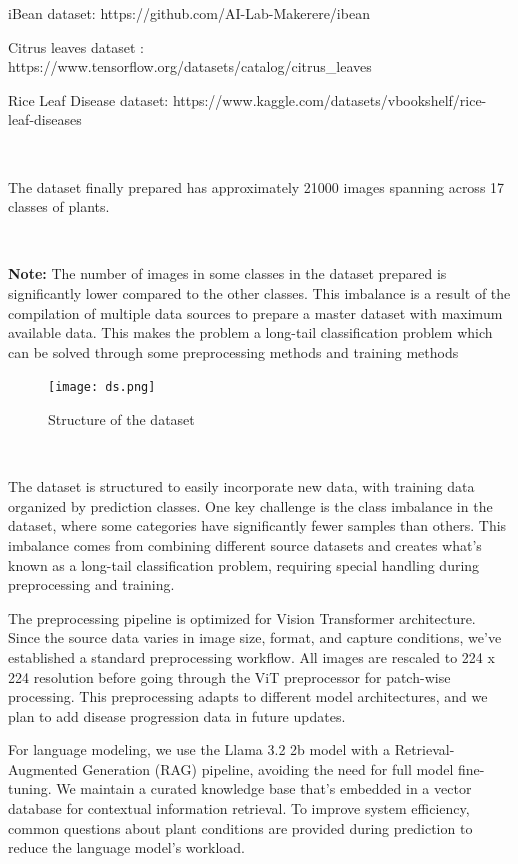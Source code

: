 iBean dataset: https://github.com/AI-Lab-Makerere/ibean

Citrus leaves dataset : https://www.tensorflow.org/datasets/catalog/citrus\_leaves

Rice Leaf Disease dataset: https://www.kaggle.com/datasets/vbookshelf/rice-leaf-diseases

\

The dataset finally prepared has approximately 21000 images spanning across 17 classes of plants.

\

 \textbf{Note:} The number of images in some classes in the dataset prepared is significantly lower compared to the other classes. This imbalance is a result of the compilation of multiple data sources to prepare a master dataset with maximum available data. This makes the problem a long-tail classification problem which can be solved through some preprocessing methods and training methods


 \begin{figure}[h!]
    \centering
    \texttt{[image: ds.png]}
    \caption{Structure of the dataset}
    \label{fig:dataset_structure}
\end{figure}


\

The dataset is structured to easily incorporate new data, with training data organized by prediction classes. One key challenge is the class imbalance in the dataset, where some categories have significantly fewer samples than others. This imbalance comes from combining different source datasets and creates what's known as a long-tail classification problem, requiring special handling during preprocessing and training.

The preprocessing pipeline is optimized for Vision Transformer architecture. Since the source data varies in image size, format, and capture conditions, we've established a standard preprocessing workflow. All images are rescaled to 224 x 224 resolution before going through the ViT preprocessor for patch-wise processing. This preprocessing adapts to different model architectures, and we plan to add disease progression data in future updates.

For language modeling, we use the Llama 3.2 2b model with a Retrieval-Augmented Generation (RAG) pipeline, avoiding the need for full model fine-tuning. We maintain a curated knowledge base that's embedded in a vector database for contextual information retrieval. To improve system efficiency, common questions about plant conditions are provided during prediction to reduce the language model's workload.

